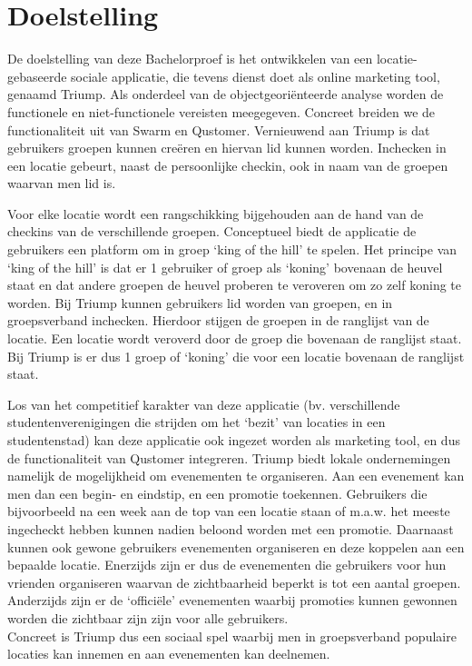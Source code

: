 
\chapter{Doelstelling}

De doelstelling van deze Bachelorproef is het ontwikkelen van een locatie-gebaseerde sociale applicatie, die tevens dienst doet als online marketing tool, genaamd Triump. Als onderdeel van de objectgeoriënteerde analyse worden de functionele en niet-functionele vereisten meegegeven.
Concreet breiden we de functionaliteit uit van Swarm en Qustomer. Vernieuwend aan Triump is dat gebruikers groepen kunnen creëren en hiervan lid kunnen worden. Inchecken in een locatie gebeurt, naast de persoonlijke checkin, ook in naam van de groepen waarvan men lid is.  


Voor elke locatie wordt een rangschikking bijgehouden aan de hand van de checkins van de verschillende groepen. Conceptueel biedt de applicatie de gebruikers een platform om in groep `king of the hill' te spelen. Het principe van `king of the hill' is dat er 1 gebruiker of groep als `koning' bovenaan de heuvel staat en dat andere groepen de heuvel proberen te veroveren om zo zelf koning te worden. Bij Triump kunnen gebruikers lid worden van groepen, en in groepsverband inchecken. Hierdoor stijgen de groepen in de ranglijst van de locatie. Een locatie wordt veroverd door de groep die bovenaan de ranglijst staat.
Bij Triump is er dus 1 groep of `koning' die voor een locatie bovenaan de ranglijst staat.

Los van het competitief karakter van deze applicatie (bv. verschillende studentenverenigingen die strijden om het ‘bezit’ van locaties in een studentenstad) kan deze applicatie ook ingezet worden als marketing tool, en dus de functionaliteit van Qustomer integreren.
Triump biedt lokale ondernemingen namelijk de mogelijkheid om evenementen te organiseren. Aan een evenement kan men dan een begin- en eindstip, en een promotie toekennen. Gebruikers die bijvoorbeeld na een week aan de top van een locatie staan of m.a.w. het meeste ingecheckt hebben kunnen nadien beloond worden met een promotie. Daarnaast kunnen ook gewone gebruikers evenementen organiseren en deze koppelen aan een bepaalde locatie.
Enerzijds zijn er dus de evenementen die gebruikers voor hun vrienden organiseren waarvan de zichtbaarheid beperkt is tot een aantal groepen. Anderzijds zijn er de `officiële' evenementen waarbij promoties kunnen gewonnen worden die zichtbaar zijn zijn voor alle gebruikers. 
\\Concreet is Triump dus een sociaal spel waarbij men in groepsverband populaire locaties kan innemen en aan evenementen kan deelnemen.


